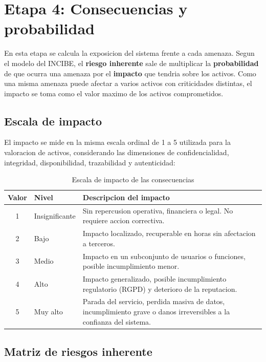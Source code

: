 \documentclass[11pt, a4paper]{article}
\begin{document}
\section{Etapa 4: Consecuencias y probabilidad}

En esta etapa se calcula la exposicion del sistema frente a cada amenaza. Segun el modelo del INCIBE, el \textbf{riesgo inherente} sale de multiplicar la \textbf{probabilidad} de que ocurra una amenaza por el \textbf{impacto} que tendria sobre los activos. Como una misma amenaza puede afectar a varios activos con criticidades distintas, el impacto se toma como el valor maximo de los activos comprometidos.

\subsection{Escala de impacto}

El impacto se mide en la misma escala ordinal de 1 a 5 utilizada para la valoracion de activos, considerando las dimensiones de confidencialidad, integridad, disponibilidad, trazabilidad y autenticidad:

\begin{table}[H]
\centering
\renewcommand{\arraystretch}{1.4}
\small
\begin{tabular}{|c|l|p{9cm}|}
\hline
\textbf{Valor} & \textbf{Nivel} & \textbf{Descripcion del impacto} \\
\hline
1 & Insignificante & Sin repercusion operativa, financiera o legal. No requiere accion correctiva. \\
\hline
2 & Bajo & Impacto localizado, recuperable en horas sin afectacion a terceros. \\
\hline
3 & Medio & Impacto en un subconjunto de usuarios o funciones, posible incumplimiento menor. \\
\hline
4 & Alto & Impacto generalizado, posible incumplimiento regulatorio (RGPD) y deterioro de la reputacion. \\
\hline
5 & Muy alto & Parada del servicio, perdida masiva de datos, incumplimiento grave o danos irreversibles a la confianza del sistema. \\
\hline
\end{tabular}
\caption{Escala de impacto de las consecuencias}
\label{tab:escala-impacto}
\end{table}

\subsection{Matriz de riesgos inherente}
\end{document}
